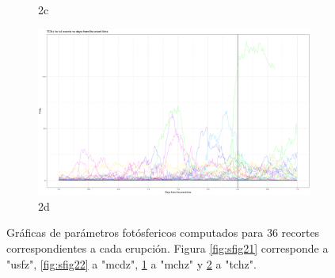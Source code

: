\documentclass[12pt,a4paper,spanish]{article}
\begin{document}
\begin{figure}[H]
\begin{subfigure}{.5\textwidth}
    \caption{2c}
    \label{fig:sfig23}
    \end{subfigure}%
    \begin{subfigure}{.5\textwidth}
    \centering
    \includegraphics[width=.8\linewidth,scale=0.5]{Rplot03.png}
    \caption{2d}
    \label{fig:sfig24}
    \end{subfigure}
    \caption{Gráficas de parámetros fotósfericos computados para 36 recortes correspondientes a cada erupción. Figura \ref{fig:sfig21} corresponde a "usfz", \ref{fig:sfig22} a "mcdz", \ref{fig:sfig23} a "mchz" y \ref{fig:sfig24} a "tchz".}
    \label{fig:figura2}
\end{figure}
\end{document}
